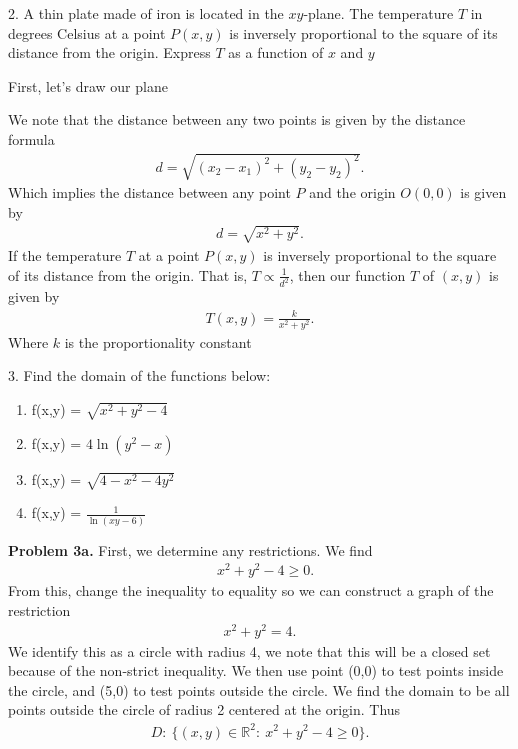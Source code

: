 \documentclass{report}
\begin{document}
    \bigbreak \noindent 
    \begin{mdframed}
        2. A thin plate made of iron is located in the $xy$-plane. The temperature $T$ in degrees Celsius at a point $P(x, y)$ is inversely proportional to the square of its distance from the origin. Express $T$ as a function of $x $ and $y$
    \end{mdframed}
    \bigbreak \noindent 
    First, let's draw our plane
    \bigbreak \noindent 
    \begin{figure}[ht]
        \centering
        \label{fig:drawplane}
    \end{figure}
    \bigbreak \noindent 
    We note that the distance between any two points is given by the distance formula
    \begin{align*}
        d = \sqrt{(x_{2} - x_{1})^{2} + (y_{2} - y_{2})^{2}}
    .\end{align*}
    Which implies the distance between any point $P$ and the origin $O(0,0)$ is given by 
    \begin{align*}
        d = \sqrt{x^{2} + y^{2}}
    .\end{align*}
    If the temperature $T$ at a point $P(x,y)$ is inversely proportional to the square of its distance from the origin. That is, $T \propto \frac{1}{d^{2}}$, then our function $T$ of $(x,y)$ is given by 
    \begin{align*}
        T(x,y) = \frac{k}{x^{2} + y^{2}}
    .\end{align*}
    Where $k$ is the proportionality constant

    \bigbreak \noindent 
    \begin{mdframed}
        3. Find the domain of the functions below:
        \begin{enumerate}[label=(\alph*)]
            \item f(x,y) = $\sqrt{x^{2} + y^{2} -4}$
            \item f(x,y) = $4\ln{(y^{2} -x)}$
            \item f(x,y) = $\sqrt{4-x^{2}-4y^{2}}$
            \item f(x,y) = $\frac{1}{\ln{(xy-6)}}$
        \end{enumerate}
    \end{mdframed}
    \bigbreak \noindent 
    \textbf{Problem 3a.} First, we determine any restrictions. We find
    \begin{align*}
        &x^{2} + y^{2} - 4 \geq 0
    .\end{align*}
    From this, change the inequality to equality so we can construct a graph of the restriction
    \begin{align*}
        x^{2} + y^{2} = 4
    .\end{align*}
    We identify this as a circle with radius 4, we note that this will be a closed set because of the non-strict inequality. We then use point (0,0) to test points inside the circle, and (5,0) to test points outside the circle. We find the domain to be all points outside the circle of radius 2 centered at the origin. Thus
    \begin{align*}
        D:\ \{(x,y) \in \mathbb{R}^{2}:\ x^{2} + y^{2} - 4 \geq 0\}
    .\end{align*}
\end{document}
